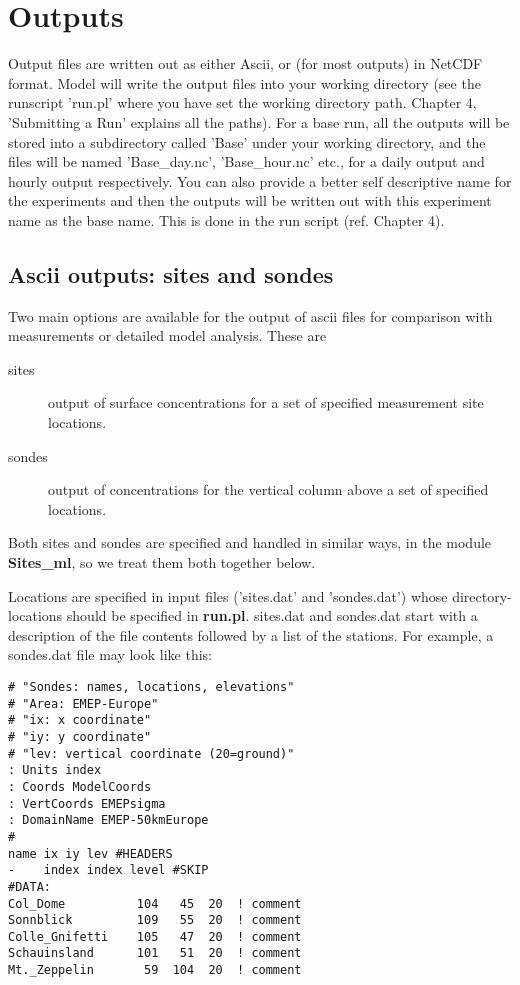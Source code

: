 \chapter{Outputs}
\label{Output:ascii}

Output files are written out as either Ascii, or
(for most outputs) in NetCDF format.  
Model will write the output files into your working directory (see the
runscript 'run.pl' where you have set the working directory
path. Chapter 4, 'Submitting a Run' explains all the paths).  For a
base run, all the outputs will be stored into a subdirectory called
'Base' under your working directory, and the files will be named
'Base\_day.nc', 'Base\_hour.nc' etc., for a daily output and hourly
output respectively.  You can also provide a better self descriptive
name for the experiments and then the outputs will be written out with
this experiment name as the base name. This is done in the run
script (ref. Chapter 4).  


\section{Ascii outputs: sites and sondes}


Two main options are available for the output of ascii files for comparison
with measurements or detailed model analysis. These are

\begin{description}
\item[sites]  

      output of surface concentrations for a set of specified
      measurement site locations.
\item[sondes] 

      output of concentrations for the vertical column above
     a set of specified locations.
\end{description}

Both sites and sondes are specified and handled in similar ways, in
the module {\bf Sites\_ml}, so we treat them both together below.

Locations are specified in input files ('sites.dat' and 'sondes.dat')
whose directory-locations should be specified in {\bf run.pl}.
sites.dat and sondes.dat start with a description of the file contents
followed by a list of the stations. For example, a sondes.dat file
may look like this:


\begin{small}
\begin{verbatim}
# "Sondes: names, locations, elevations"
# "Area: EMEP-Europe"
# "ix: x coordinate"
# "iy: y coordinate"
# "lev: vertical coordinate (20=ground)"
: Units index
: Coords ModelCoords
: VertCoords EMEPsigma
: DomainName EMEP-50kmEurope
#
name ix iy lev #HEADERS
-    index index level #SKIP
#DATA:
Col_Dome          104   45  20  ! comment
Sonnblick         109   55  20  ! comment
Colle_Gnifetti    105   47  20  ! comment
Schauinsland      101   51  20  ! comment
Mt._Zeppelin       59  104  20  ! comment
\end{verbatim}
\end{small}

